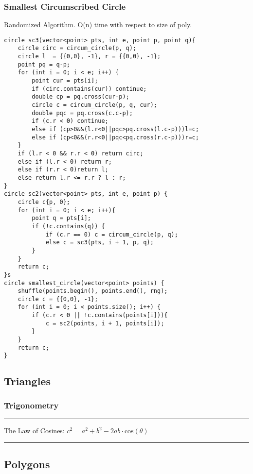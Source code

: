 \documentclass[10pt]{article}{\twocolumn}
\begin{document}
\subsubsection{Smallest Circumscribed Circle}
Randomized Algorithm. O(n) time with respect to size of poly.
\begin{lstlisting}
circle sc3(vector<point> pts, int e, point p, point q){
    circle circ = circum_circle(p, q);
    circle l  = {{0,0}, -1}, r = {{0,0}, -1};
    point pq = q-p;
    for (int i = 0; i < e; i++) {
        point cur = pts[i];
        if (circ.contains(cur)) continue;
        double cp = pq.cross(cur-p);
        circle c = circum_circle(p, q, cur);
        double pqc = pq.cross(c.c-p);
        if (c.r < 0) continue;
        else if (cp>0&&(l.r<0||pqc>pq.cross(l.c-p)))l=c;
        else if (cp<0&&(r.r<0||pqc<pq.cross(r.c-p)))r=c;
    }
    if (l.r < 0 && r.r < 0) return circ;
    else if (l.r < 0) return r;
    else if (r.r < 0)return l;
    else return l.r <= r.r ? l : r;
}
circle sc2(vector<point> pts, int e, point p) {
    circle c{p, 0};
    for (int i = 0; i < e; i++){
        point q = pts[i];
        if (!c.contains(q)) {
            if (c.r == 0) c = circum_circle(p, q);
            else c = sc3(pts, i + 1, p, q);
        }
    }
    return c;
}s
circle smallest_circle(vector<point> points) {
    shuffle(points.begin(), points.end(), rng);
    circle c = {{0,0}, -1};
    for (int i = 0; i < points.size(); i++) {
        if (c.r < 0 || !c.contains(points[i])){
            c = sc2(points, i + 1, points[i]);
        }
    }
    return c;
}
\end{lstlisting}

\subsection{Triangles}

\subsubsection{Trigonometry}
\hrule
\vspace{1mm}
\textrm{The Law of Cosines: }$c^2=a^2+b^2-2ab\cdot\textrm{cos}(\theta)$
\vspace{1mm}
\hrule
\vspace{1mm}
\subsection{Polygons}
\end{document}
